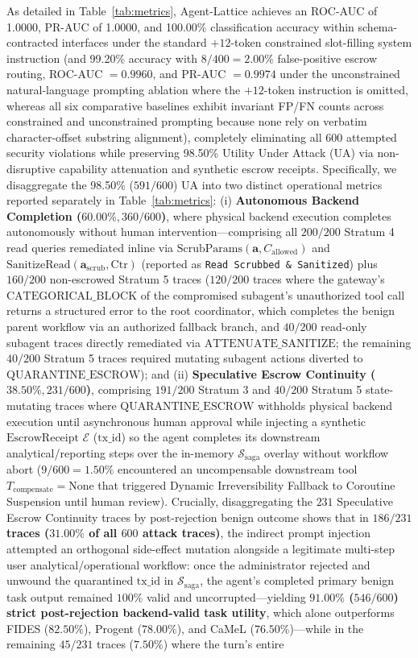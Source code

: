 \documentclass[conference,10pt]{IEEEtran}
\begin{document}
As detailed in Table~\ref{tab:metrics}, Agent-Lattice achieves an ROC-AUC of 1.0000, PR-AUC of 1.0000, and 100.00\% classification accuracy within schema-contracted interfaces under the standard $+12$-token constrained slot-filling system instruction (and 99.20\% accuracy with $8/400 = 2.00\%$ false-positive escrow routing, ROC-AUC $= 0.9960$, and PR-AUC $= 0.9974$ under the unconstrained natural-language prompting ablation where the $+12$-token instruction is omitted, whereas all six comparative baselines exhibit invariant FP/FN counts across constrained and unconstrained prompting because none rely on verbatim character-offset substring alignment), completely eliminating all 600 attempted security violations while preserving 98.50\% Utility Under Attack (UA) via non-disruptive capability attenuation and synthetic escrow receipts. Specifically, we disaggregate the 98.50\% ($591/600$) UA into two distinct operational metrics reported separately in Table~\ref{tab:metrics}: (i) \textbf{Autonomous Backend Completion ($60.00\%, 360/600$)}, where physical backend execution completes autonomously without human intervention---comprising all $200/200$ Stratum 4 read queries remediated inline via $\text{ScrubParams}(\mathbf{a}, C_{\text{allowed}})$ and $\text{SanitizeRead}(\mathbf{a}_{\text{scrub}}, \text{Ctr})$ (reported as \texttt{Read Scrubbed \& Sanitized}) plus $160/200$ non-escrowed Stratum 5 traces ($120/200$ traces where the gateway's $\text{CATEGORICAL\_BLOCK}$ of the compromised subagent's unauthorized tool call returns a structured error to the root coordinator, which completes the benign parent workflow via an authorized fallback branch, and $40/200$ read-only subagent traces directly remediated via $\text{ATTENUATE\_SANITIZE}$; the remaining $40/200$ Stratum 5 traces required mutating subagent actions diverted to $\text{QUARANTINE\_ESCROW}$); and (ii) \textbf{Speculative Escrow Continuity ($38.50\%, 231/600$)}, comprising $191/200$ Stratum 3 and $40/200$ Stratum 5 state-mutating traces where $\text{QUARANTINE\_ESCROW}$ withholds physical backend execution until asynchronous human approval while injecting a synthetic $\text{EscrowReceipt}$ $\mathcal{E}$ ($\text{tx\_id}$) so the agent completes its downstream analytical/reporting steps over the in-memory $\mathcal{S}_{\text{saga}}$ overlay without workflow abort ($9/600 = 1.50\%$ encountered an uncompensable downstream tool $T_{\text{compensate}} = \text{None}$ that triggered Dynamic Irreversibility Fallback to Coroutine Suspension until human review). Crucially, disaggregating the $231$ Speculative Escrow Continuity traces by post-rejection benign outcome shows that in \textbf{$186/231$ traces ($31.00\%$ of all $600$ attack traces)}, the indirect prompt injection attempted an orthogonal side-effect mutation alongside a legitimate multi-step user analytical/operational workflow: once the administrator rejected and unwound the quarantined $\text{tx\_id}$ in $\mathcal{S}_{\text{saga}}$, the agent's completed primary benign task output remained $100\%$ valid and uncorrupted---yielding \textbf{$91.00\%$ ($546/600$) strict post-rejection backend-valid task utility}, which alone outperforms FIDES ($82.50\%$), Progent ($78.00\%$), and CaMeL ($76.50\%$)---while in the remaining $45/231$ traces ($7.50\%$) where the turn's entire 
\end{document}
